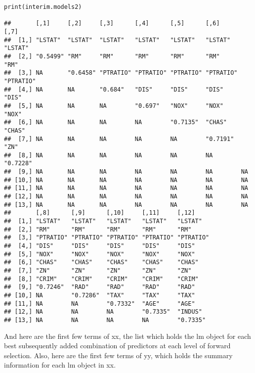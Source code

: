 \documentclass[]{article}
\begin{document}
\begin{verbatim}
print(interim.models2) 

##       [,1]     [,2]     [,3]      [,4]      [,5]      [,6]      [,7]     
##  [1,] "LSTAT"  "LSTAT"  "LSTAT"   "LSTAT"   "LSTAT"   "LSTAT"   "LSTAT"  
##  [2,] "0.5499" "RM"     "RM"      "RM"      "RM"      "RM"      "RM"     
##  [3,] NA       "0.6458" "PTRATIO" "PTRATIO" "PTRATIO" "PTRATIO" "PTRATIO"
##  [4,] NA       NA       "0.684"   "DIS"     "DIS"     "DIS"     "DIS"    
##  [5,] NA       NA       NA        "0.697"   "NOX"     "NOX"     "NOX"    
##  [6,] NA       NA       NA        NA        "0.7135"  "CHAS"    "CHAS"   
##  [7,] NA       NA       NA        NA        NA        "0.7191"  "ZN"     
##  [8,] NA       NA       NA        NA        NA        NA        "0.7228" 
##  [9,] NA       NA       NA        NA        NA        NA        NA       
## [10,] NA       NA       NA        NA        NA        NA        NA       
## [11,] NA       NA       NA        NA        NA        NA        NA       
## [12,] NA       NA       NA        NA        NA        NA        NA       
## [13,] NA       NA       NA        NA        NA        NA        NA       
##       [,8]      [,9]      [,10]     [,11]     [,12]    
##  [1,] "LSTAT"   "LSTAT"   "LSTAT"   "LSTAT"   "LSTAT"  
##  [2,] "RM"      "RM"      "RM"      "RM"      "RM"     
##  [3,] "PTRATIO" "PTRATIO" "PTRATIO" "PTRATIO" "PTRATIO"
##  [4,] "DIS"     "DIS"     "DIS"     "DIS"     "DIS"    
##  [5,] "NOX"     "NOX"     "NOX"     "NOX"     "NOX"    
##  [6,] "CHAS"    "CHAS"    "CHAS"    "CHAS"    "CHAS"   
##  [7,] "ZN"      "ZN"      "ZN"      "ZN"      "ZN"     
##  [8,] "CRIM"    "CRIM"    "CRIM"    "CRIM"    "CRIM"   
##  [9,] "0.7246"  "RAD"     "RAD"     "RAD"     "RAD"    
## [10,] NA        "0.7286"  "TAX"     "TAX"     "TAX"    
## [11,] NA        NA        "0.7332"  "AGE"     "AGE"    
## [12,] NA        NA        NA        "0.7335"  "INDUS"  
## [13,] NA        NA        NA        NA        "0.7335"
\end{verbatim}

And here are the first few terms of xx, the list which holds the lm
object for each best subsequently added combination of predictors at
each level of forward selection. Also, here are the first few terms of
yy, which holds the summary information for each lm object in xx.
\end{document}
